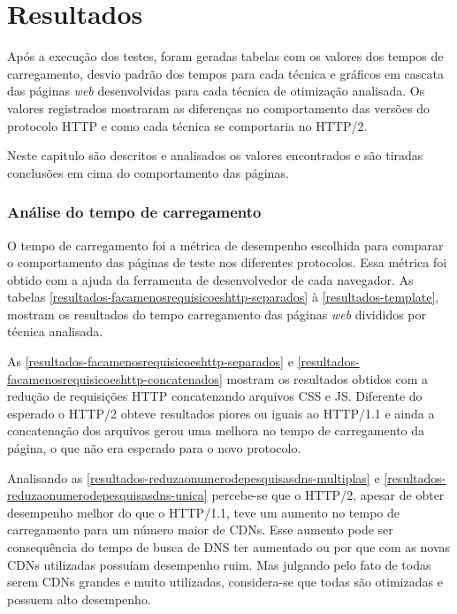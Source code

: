 %
%

\chapter{Resultados}

Após a execução dos testes, foram geradas tabelas com os valores dos tempos de carregamento, desvio padrão dos tempos para cada técnica e gráficos em cascata das páginas \textit{web} desenvolvidas para cada técnica de otimização analisada. Os valores registrados mostraram as diferenças no comportamento das versões do protocolo HTTP e como cada técnica se comportaria no HTTP/2.

Neste capitulo são descritos e analisados os valores encontrados e são tiradas conclusões em cima do comportamento das páginas.

\subsection{Análise do tempo de carregamento}
\label{analisedotempodecarregamento}

O tempo de carregamento foi a métrica de desempenho escolhida para comparar o comportamento das páginas de teste nos diferentes protocolos. Essa métrica foi obtido com a ajuda da ferramenta de desenvolvedor de cada navegador. As tabelas \autoref{resultados-facamenosrequisicoeshttp-separados} à \autoref{resultados-template}, mostram os resultados do tempo carregamento das páginas \textit{web} divididos por técnica analisada.





As \autoref{resultados-facamenosrequisicoeshttp-separados} e \autoref{resultados-facamenosrequisicoeshttp-concatenados} mostram os resultados obtidos com a redução de requisições HTTP concatenando arquivos CSS e JS. Diferente do esperado o HTTP/2 obteve resultados piores ou iguais ao HTTP/1.1 e ainda a concatenação dos arquivos gerou uma melhora no tempo de carregamento da página, o que não era esperado para o novo protocolo.





Analisando as \autoref{resultados-reduzaonumerodepesquisasdns-multiplas} e \autoref{resultados-reduzaonumerodepesquisasdns-unica} percebe-se que o HTTP/2, apesar de obter desempenho melhor do que o HTTP/1.1, teve um aumento no tempo de carregamento para um número maior de CDNs. Esse aumento pode ser consequência do tempo de busca de DNS ter aumentado ou por que com as novas CDNs utilizadas possuíam desempenho ruim. Mas julgando pelo fato de todas serem CDNs grandes e muito utilizadas, considera-se que todas são otimizadas e possuem alto desempenho. 

